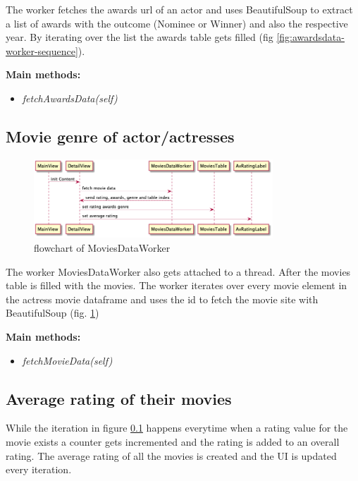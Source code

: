 \documentclass[12pt]{article}
\begin{document}
The worker fetches the awards url
of an actor and uses BeautifulSoup to extract a list of awards with the 
outcome (Nominee or Winner) and also the respective year. By iterating over 
the list the awards table gets filled (fig \ref{fig:awardsdata-worker-sequence}).

\textbf{Main methods:}
\begin{itemize}
      \item \textit{fetchAwardsData(self)}
\end{itemize}

\subsection{Movie genre of actor/actresses} \label{genre}
\begin{figure}[H]
      \centering
      \includegraphics[width=0.8\textwidth]{img/movies-data-worker-sequence.png}
      \caption{\label{fig:movies-data-worker-sequence} flowchart of MoviesDataWorker}
\end{figure}

The worker MoviesDataWorker also gets attached to a thread. After the movies table 
is filled with the movies. The worker iterates over every movie element in the 
actress movie dataframe and uses the id to fetch the movie site with BeautifulSoup (fig. \ref{fig:movies-data-worker-sequence})

\textbf{Main methods:}
\begin{itemize}
      \item \textit{fetchMovieData(self)}
\end{itemize}

\subsection{Average rating of their movies} \label{average-rating}
While the iteration in figure \ref{genre} happens everytime when a rating value for the movie exists
a counter gets incremented and the rating is added to an overall rating. The average rating of all
the movies is created and the UI is updated every iteration.
\end{document}
